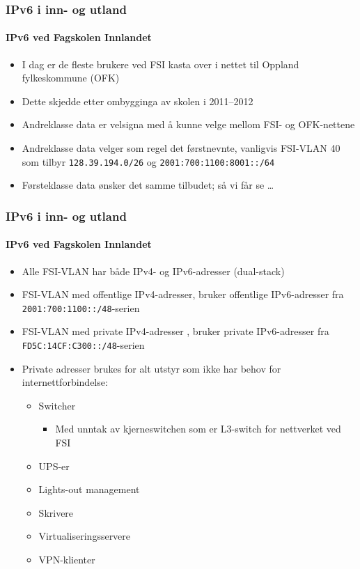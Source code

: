 \begin{frame}
  \frametitle{IPv6 i inn- og utland}
  \framesubtitle{IPv6 ved Fagskolen Innlandet}
  \begin{itemize}
  \item I dag er de fleste brukere ved FSI kasta over i nettet til
    Oppland fylkeskommune (OFK)
  \item Dette skjedde etter ombygginga av skolen i 2011--2012
  \item Andreklasse data er velsigna med å kunne velge mellom FSI- og
    OFK-nettene
  \item Andreklasse data velger som regel det førstnevnte, vanligvis
    FSI-VLAN 40 som tilbyr \texttt{128.39.194.0/26} og
    \texttt{2001:700:1100:8001::/64}
  \item Førsteklasse data ønsker det samme tilbudet; så vi får se \dots
  \end{itemize}
\end{frame}

\begin{frame}
  \frametitle{IPv6 i inn- og utland}
  \framesubtitle{IPv6 ved Fagskolen Innlandet}
  \begin{itemize}
  \item Alle FSI-VLAN har både IPv4- og IPv6-adresser (dual-stack)
  \item FSI-VLAN med offentlige IPv4-adresser, bruker offentlige
    IPv6-adresser fra \texttt{2001:700:1100::/48}-serien
  \item FSI-VLAN med private IPv4-adresser , bruker private
    IPv6-adresser fra \texttt{FD5C:14CF:C300::/48}-serien
  \item Private adresser brukes for alt utstyr som ikke har behov for
    internettforbindelse:
    \begin{itemize}
    \item Switcher
      \begin{itemize}
      \item Med unntak av kjerneswitchen som er L3-switch for
        nettverket ved FSI
      \end{itemize}
    \item UPS-er
    \item Lights-out management
    \item Skrivere
    \item Virtualiseringsservere
    \item VPN-klienter
    \end{itemize}
  \end{itemize}
\end{frame}

